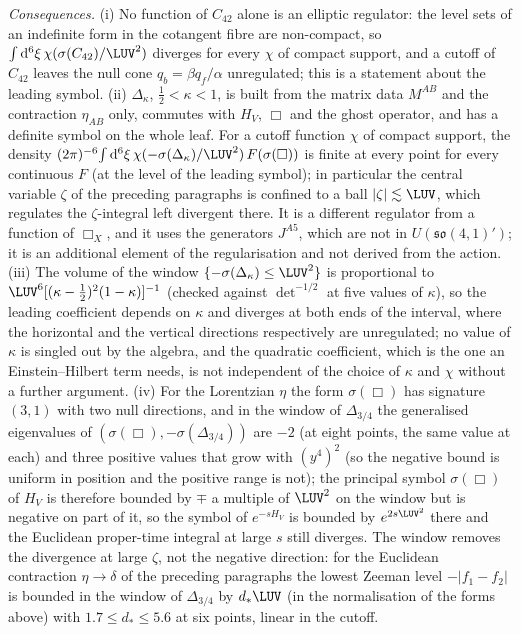 \emph{Consequences.} (i) No function of \(C_{42}\) alone is an elliptic regulator: the level sets of an indefinite form in the cotangent fibre are non-compact, so \(\int\mathrm d^6\xi\,\chi(\sigma(C_{42})/\LUV^2)\) diverges for every \(\chi\) of compact support, and a cutoff of \(C_{42}\) leaves the null cone \(q_b=\beta q_f/\alpha\) unregulated; this is a statement about the leading symbol. (ii) \(\Delta_\kappa\), \(\tfrac12<\kappa<1\), is built from the matrix data \(M^{AB}\) and the contraction \(\eta_{AB}\) only, commutes with \(H_V\), \(\Box\) and the ghost operator, and has a definite symbol on the whole leaf. For a cutoff function \(\chi\) of compact support, the density \((2\pi)^{-6}\!\int\mathrm d^6\xi\,\chi(-\sigma(\Delta_\kappa)/\LUV^2)\,F(\sigma(\Box))\) is finite at every point for every continuous \(F\) (at the level of the leading symbol); in particular the central variable \(\zeta\) of the preceding paragraphs is confined to a ball \(|\zeta|\lesssim\LUV\), which regulates the \(\zeta\)-integral left divergent there. It is a different regulator from a function of \(\Box_X\), and it uses the generators \(J^{A5}\), which are not in \(U(\mathfrak{so}(4,1)')\); it is an additional element of the regularisation and not derived from the action. (iii) The volume of the window \(\{-\sigma(\Delta_\kappa)\le\LUV^2\}\) is proportional to \(\LUV^6[(\kappa-\tfrac12)^2(1-\kappa)]^{-1}\) (checked against \(\det^{-1/2}\) at five values of \(\kappa\)), so the leading coefficient depends on \(\kappa\) and diverges at both ends of the interval, where the horizontal and the vertical directions respectively are unregulated; no value of \(\kappa\) is singled out by the algebra, and the quadratic coefficient, which is the one an Einstein--Hilbert term needs, is not independent of the choice of \(\kappa\) and \(\chi\) without a further argument. (iv) For the Lorentzian \(\eta\) the form \(\sigma(\Box)\) has signature \((3,1)\) with two null directions, and in the window of \(\Delta_{3/4}\) the generalised eigenvalues of \((\sigma(\Box),-\sigma(\Delta_{3/4}))\) are \(-2\) (at eight points, the same value at each) and three positive values that grow with \((y^4)^2\) (so the negative bound is uniform in position and the positive range is not); the principal symbol \(\sigma(\Box)\) of \(H_V\) is therefore bounded by \(\mp\) a multiple of \(\LUV^2\) on the window but is negative on part of it, so the symbol of \(e^{-sH_V}\) is bounded by \(e^{2s\LUV^2}\) there and the Euclidean proper-time integral at large \(s\) still diverges. The window removes the divergence at large \(\zeta\), not the negative direction: for the Euclidean contraction \(\eta\to\delta\) of the preceding paragraphs the lowest Zeeman level \(-|f_1-f_2|\) is bounded in the window of \(\Delta_{3/4}\) by \(d_*\LUV\) (in the normalisation of the forms above) with \(1.7\le d_*\le5.6\) at six points, linear in the cutoff.



